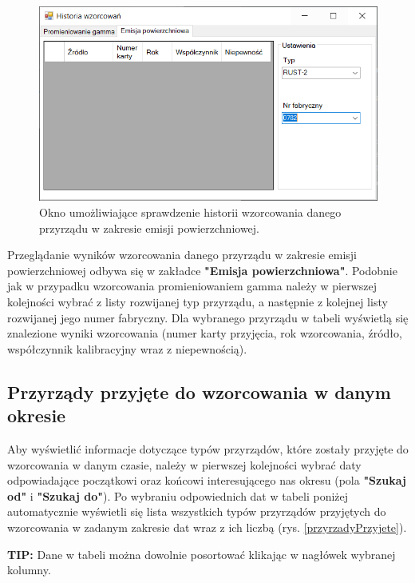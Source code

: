 \begin{figure}[htb]
	\centering
	\includegraphics{obrazki/Wyszukiwanie/historia_wzorcowan_skazenia.png}
	\caption{Okno umożliwiające sprawdzenie historii wzorcowania danego przyrządu w zakresie emisji powierzchniowej.}
	\label{historiaWzorcowanSkazenia}
\end{figure}

Przeglądanie wyników wzorcowania danego przyrządu w zakresie emisji powierzchniowej odbywa się w zakładce \textbf{"Emisja powierzchniowa"}. Podobnie jak w przypadku wzorcowania promieniowaniem gamma należy w pierwszej kolejności wybrać z listy rozwijanej typ przyrządu, a następnie z kolejnej listy rozwijanej jego numer fabryczny. Dla wybranego przyrządu w tabeli wyświetlą się znalezione wyniki wzorcowania (numer karty przyjęcia, rok wzorcowania, źródło, współczynnik kalibracyjny wraz z niepewnością).

\subsection{Przyrządy przyjęte do wzorcowania w danym okresie}
\label{przyrzady_przyjete}

Aby wyświetlić informacje dotyczące typów przyrządów, które zostały przyjęte do wzorcowania w danym czasie, należy w pierwszej kolejności wybrać daty odpowiadające początkowi oraz końcowi interesującego nas okresu (pola \textbf{"Szukaj od"} i \textbf{"Szukaj do"}). Po wybraniu odpowiednich dat w tabeli poniżej automatycznie wyświetli się lista wszystkich typów przyrządów przyjętych do wzorcowania w zadanym zakresie dat wraz z ich liczbą  (rys. \ref{przyrzadyPrzyjete}).

\textbf{TIP:} Dane w tabeli można dowolnie posortować klikając w nagłówek wybranej kolumny.


